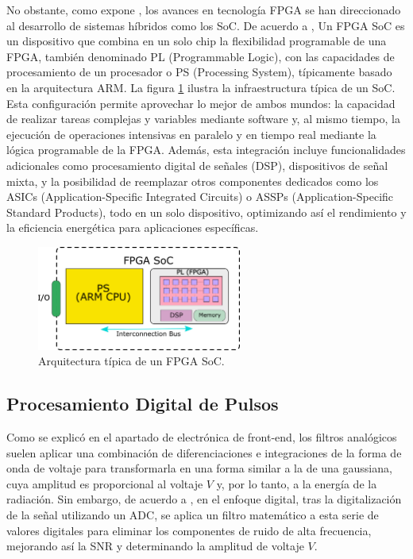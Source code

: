 \documentclass[]{book}
\begin{document}
\noindent No obstante, como expone \cite{bravo2020new}, los avances en tecnología FPGA se han direccionado al desarrollo de sistemas híbridos como los SoC. De acuerdo a \cite{amd_zynq_7000}, Un FPGA SoC es un dispositivo que combina en un solo chip la flexibilidad programable de una FPGA, también denominado PL (Programmable Logic), con las capacidades de procesamiento de un procesador o PS (Processing System), típicamente basado en la arquitectura ARM. La figura \ref{fig:fpga_soc} ilustra la infraestructura típica de un SoC. \\ 

\noindent Esta configuración permite aprovechar lo mejor de ambos mundos: la capacidad de realizar tareas complejas y variables mediante software y, al mismo tiempo, la ejecución de operaciones intensivas en paralelo y en tiempo real mediante la lógica programable de la FPGA. Además, esta integración incluye funcionalidades adicionales como procesamiento digital de señales (DSP), dispositivos de señal mixta, y la posibilidad de reemplazar otros componentes dedicados como los ASICs (Application-Specific Integrated Circuits) o ASSPs (Application-Specific Standard Products), todo en un solo dispositivo, optimizando así el rendimiento y la eficiencia energética para aplicaciones específicas.\\

\begin{figure}[h]
    \centering
    \includegraphics[width=0.6\textwidth]{FPGA_SoC.png}
    \caption{Arquitectura típica de un FPGA SoC.}
    \label{fig:fpga_soc}

\end{figure}

\subsection{Procesamiento Digital de Pulsos}
 
\noindent Como se explicó en el apartado de electrónica de front-end, los filtros analógicos suelen aplicar una combinación de diferenciaciones e integraciones de la forma de onda de voltaje para transformarla en una forma similar a la de una gaussiana, cuya amplitud es proporcional al voltaje $V$ y, por lo tanto, a la energía de la radiación. Sin embargo, de acuerdo a \cite{loudenuclearspectroscopy}, en el enfoque digital, tras la digitalización de la señal utilizando un ADC, se aplica un filtro matemático a esta serie de valores digitales para eliminar los componentes de ruido de alta frecuencia, mejorando así la SNR y determinando la amplitud de voltaje $V$.\\
\end{document}
